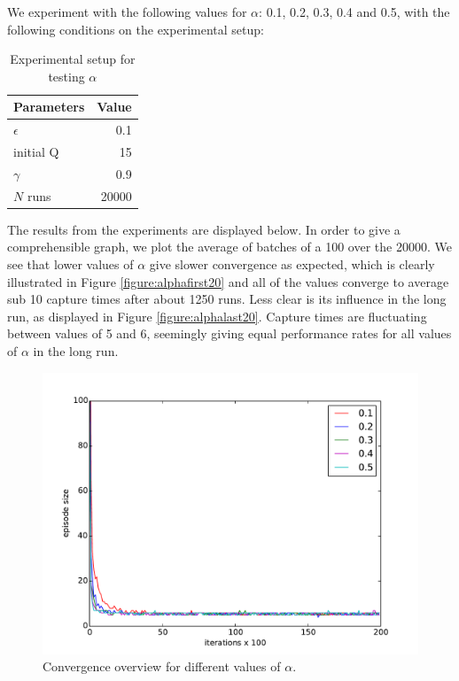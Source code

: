 \documentclass[paper=a4, fontsize=11pt]{scrartcl}
\makeatletter
\numberwithin{equation}{section}		%
\numberwithin{figure}{section}			%
\numberwithin{table}{section}				%
\newcounter{eqn}
\renewcommand*{\theeqn}{\alph{eqn})}
\newcommand{\num}{\refstepcounter{eqn}\text{\theeqn}\;}
\newcommand{\putindeepbox}[2][0.7\baselineskip]{{%
    \setbox0=\hbox{#2}%
    \setbox0=\vbox{\noindent\hsize=\wd0\unhbox0}
    \@tempdima=\dp0
    \advance\@tempdima by \ht0
    \advance\@tempdima by -#1\relax
    \dp0=\@tempdima
    \ht0=#1\relax
    \box0
}}
\makeatother
\begin{document}
We experiment with the following values for $\alpha$: 0.1, 0.2, 0.3, 0.4 and 0.5, with the following conditions on the experimental setup:
\begin{table}[H]
\caption{Experimental setup for testing $\alpha$}
\centering
\begin{tabular}{|l|r|}
\hline
Parameters & Value \\\hline
$\epsilon$ & 0.1 \\\hline
initial Q & 15 \\\hline
$\gamma$ & 0.9\\\hline
$N$ runs & 20000\\\hline
\end{tabular}
\label{expSetupAlpha}
\end{table}
The results from the experiments are displayed below. In order to give a comprehensible graph, we plot the average of batches of a 100 over the 20000. We see that lower values of $\alpha$ give slower convergence as expected, which is clearly  illustrated in Figure \ref{figure:alphafirst20} and all of the values converge to average sub 10 capture times after about 1250 runs. Less clear is its influence in the long run, as displayed in Figure \ref{figure:alphalast20}. Capture times are fluctuating between values of 5 and 6, seemingly giving equal performance rates for all values of $\alpha$ in the long run.
%
\begin{figure}[H] \centering
\includegraphics[scale=0.5]{alphaOverview.pdf}
\caption{Convergence overview for different values of $\alpha$.} 
\label{figure:alphaOverview}
\end{figure}
\end{document}
